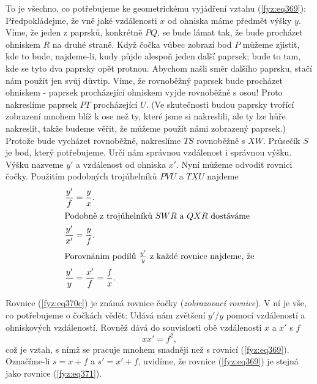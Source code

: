 {    To je všechno, co potřebujeme ke geometrickému vyjádření vztahu (\ref{fyz:eq369}): 
    Předpokládejme, že vně jaké vzdálenosti \(x\) od ohniska máme předmět výšky \(y\). Víme, že 
    jeden z paprsků, konkrétně \(PQ\), se bude lámat tak, že bude procházet ohniskem \(R\) na druhé 
    straně. Když čočka vůbec zobrazí bod \(P\) můžeme zjistit, kde to bude, najdeme-li, kudy půjde 
    alespoň jeden další paprsek; bude to tam, kde se tyto dva paprsky opět protnou. Abychom našli 
    směr dalšího paprsku, stačí nám použít jen svůj důvtip. Víme, že rovnoběžný paprsek bude 
    procházet ohniskem - paprsek procházející ohniskem vyjde rovnoběžně s osou! Proto nakreslíme 
    paprsek \(PT\) procházející \(U\). (Ve skutečnosti budou paprsky tvořící zobrazení mnohem blíž 
    k ose než ty, které jsme si nakreslili, ale ty lze hůře nakreslit, takže budeme věřit, že 
    můžeme použít námi zobrazený paprsek.) Protože bude vycházet rovnoběžně, nakreslíme \(TS\) 
    rovnoběžně s \(XW\). Průsečík \(S\) je bod, který potřebujeme. Určí nám správnou vzdálenost i 
    správnou výšku. Výšku nazveme \(y'\) a vzdálenost od ohniska \(x'\). Nyní můžeme odvodit 
    rovnici čočky. Použitím podobných trojúhelníků \(PVU\) a \(TXU\) najdeme
    \begin{subequations}\label{fyz:eq370}
      \begin{align}
       \frac{y'}{f}  &= \frac{y}{x}.                                     \label{fyz:eq370a}  \\
        \shortintertext{Podobně z trojúhelníků \(SWR\) a \(QXR\) dostáváme}
       \frac{y'}{x'} &= \frac{y}{f}.                                     \label{fyz:eq370b}  \\
        \shortintertext{Porovnáním podílů \(\frac{y'}{y}\) z každé rovnice najdeme, že}
        \frac{y'}{y} &= \frac{x'}{f} = \frac{f}{x}.                      \label{fyz:eq370c}
      \end{align}    
    \end{subequations}
    
    Rovnice (\ref{fyz:eq370c}) je známá rovnice čočky (\emph{zobrazovací rovnice}). V ní je vše, co 
    potřebujeme o čočkách vědět: Udává nám zvětšení \(y'/y\) pomocí vzdáleností a ohniskových 
    vzdáleností. Rovněž dává do souvislosti obě vzdálenosti \(x\) a \(x'\) s \(f\)
    \begin{equation}  \label{fyz:eq371}
      xx' = f^2,
    \end{equation}
    což je vztah, s nímž se pracuje mnohem snadněji než s rovnicí (\ref{fyz:eq369}). Označíme-li 
    \(s = x + f\) a \(s' = x' + f\), uvidíme, že rovnice (\ref{fyz:eq369}) je stejná jako rovnice 
    (\ref{fyz:eq371}).
    
}
